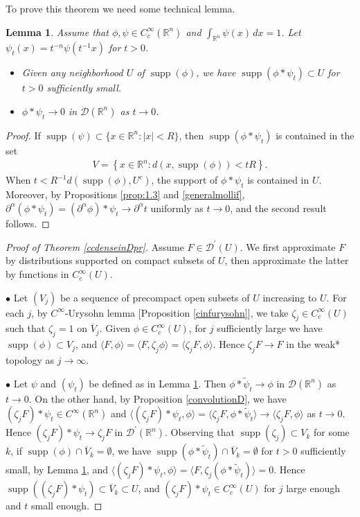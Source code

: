 \documentclass{article}
\numberwithin{equation}{section}
\newcommand{\bbR}{\mathbb{R}}
\renewcommand{\cal}{\mathcal}
\newcommand{\ol}{\overline}
\newcommand{\wt}{\widetilde}
\DeclareMathOperator{\supp}{supp}
\theoremstyle{plain}
\newtheorem{lemma}[theorem]{Lemma}
\theoremstyle{definition}
\begin{document}
To prove this theorem we need some technical lemma.
\begin{lemma}\label{ccdenseinDprlemma}
Assume that $\phi,\psi\in C_c^\infty(\bbR^n)$ and $\int_{\bbR^n}\psi(x)\,dx=1$. Let $\psi_t(x)=t^{-n}\psi(t^{-1}x)$ for $t>0$.
\begin{itemize}
	\item[(i)] Given any neighborhood $U$ of $\supp(\phi)$, we have $\supp(\phi*\psi_t)\subset U$ for $t>0$ sufficiently small.
	\item[(ii)] $\phi*\psi_t\to 0$ in $\cal{D}(\bbR^n)$ as $t\to 0$.
\end{itemize}
\end{lemma}
\begin{proof}
If $\supp(\psi)\subset\{x\in\bbR^n:\vert x\vert<R\}$, then $\supp(\phi*\psi_t)$ is contained in the set
\begin{align*}
	V=\left\{x\in\bbR^n:d(x,\supp(\phi))<tR\right\}.
\end{align*}
When $t<R^{-1}d(\supp(\phi),U^c)$, the support of $\phi*\psi_t$ is contained in $U$. Moreover, by Propositions \ref{prop:1.3} and \ref{generalmollif}, $\partial^\alpha(\phi*\psi_t)=(\partial^\alpha\phi)*\psi_t\to\partial^\alpha t$ uniformly as $t\to 0$, and the second result follows.
\end{proof}
\begin{proof}[Proof of Theorem \ref{ccdenseinDpr}]
Assume $F\in\cal{D}^\prime(U)$. We first approximate $F$ by distributions supported on compact subsets of $U$, then approximate the latter by functions in $C_c^\infty(U)$.

\item$\bullet$ Let $(V_j)$ be a sequence of precompact open subsets of $U$ increasing to $U$. For each $j$, by $C^\infty$-Urysohn lemma [Proposition \ref{cinfurysohn}], we take $\zeta_j\in C_c^\infty(U)$ such that $\zeta_j=1$ on $\ol{V}_j$. Given $\phi\in C_c^\infty(U)$, for $j$ sufficiently large we have $\supp(\phi)\subset V_j$, and $\langle F,\phi\rangle=\langle F,\zeta_j\phi\rangle=\langle\zeta_j F,\phi\rangle$. Hence $\zeta_j F\to F$ in the weak* topology as $j\to\infty$.

\item$\bullet$ Let $\psi$ and $(\psi_t)$ be defined as in Lemma \ref{ccdenseinDprlemma}. Then $\phi*\wt\psi_t\to\phi$ in $\cal{D}(\bbR^n)$ as $t\to 0$. On the other hand, by Proposition \ref{convolutionD}, we have $(\zeta_j F)*\psi_t\in C^\infty(\bbR^n)$ and $\langle(\zeta_j F)*\psi_t,\phi\rangle=\langle\zeta_j F,\phi*\wt\psi_t\rangle\to\langle\zeta_j F,\phi\rangle$ as $t\to 0$. Hence $(\zeta_j F)*\psi_t\to\zeta_j F$ in $\cal{D}^\prime(\bbR^n)$. Observing that $\supp(\zeta_j)\subset V_k$ for some $k$, if $\supp(\phi)\cap\ol{V}_k=\emptyset$, we have $\supp(\phi*\wt\psi_t)\cap\ol{V}_k=\emptyset$ for $t>0$ sufficiently small, by Lemma \ref{ccdenseinDprlemma}, and $\langle(\zeta_j F)*\psi_t,\phi\rangle=\langle F,\zeta_j(\phi*\wt\psi_t)\rangle=0$. Hence $\supp((\zeta_j F)*\psi_t)\subset\ol{V}_k\subset U$, and $(\zeta_j F)*\psi_t\in C_c^\infty(U)$ for $j$ large enough and $t$ small enough.
\end{proof}
\end{document}
